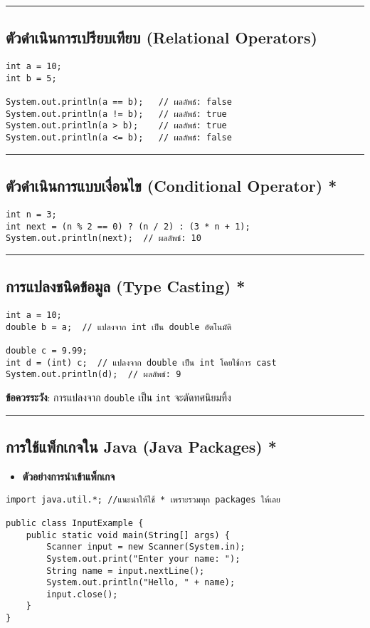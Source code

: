 \documentclass[11pt]{article}
\begin{document}
\noindent\rule{\textwidth}{0.5pt}
\subsection{ตัวดำเนินการเปรียบเทียบ (Relational Operators)}
\label{sec:org0086cbb}
\begin{verbatim}
int a = 10;
int b = 5;

System.out.println(a == b);   // ผลลัพธ์: false
System.out.println(a != b);   // ผลลัพธ์: true
System.out.println(a > b);    // ผลลัพธ์: true
System.out.println(a <= b);   // ผลลัพธ์: false
\end{verbatim}

\noindent\rule{\textwidth}{0.5pt}
\subsection{ตัวดำเนินการแบบเงื่อนไข (Conditional Operator) *}
\label{sec:org4d08e4c}
\begin{verbatim}
int n = 3;
int next = (n % 2 == 0) ? (n / 2) : (3 * n + 1);
System.out.println(next);  // ผลลัพธ์: 10
\end{verbatim}

\noindent\rule{\textwidth}{0.5pt}
\subsection{การแปลงชนิดข้อมูล (Type Casting) *}
\label{sec:org8c8078b}
\begin{verbatim}
int a = 10;
double b = a;  // แปลงจาก int เป็น double อัตโนมัติ

double c = 9.99;
int d = (int) c;  // แปลงจาก double เป็น int โดยใช้การ cast
System.out.println(d);  // ผลลัพธ์: 9
\end{verbatim}

\textbf{ข้อควรระวัง}: การแปลงจาก \texttt{double} เป็น \texttt{int} จะตัดทศนิยมทิ้ง

\noindent\rule{\textwidth}{0.5pt}
\subsection{การใช้แพ็กเกจใน Java (Java Packages) *}
\label{sec:orge6ec761}
\begin{itemize}
\item \textbf{ตัวอย่างการนำเข้าแพ็กเกจ}
\end{itemize}
\begin{verbatim}
import java.util.*; //แนะนำให้ใช้ * เพราะรวมทุก packages ให้เลย

public class InputExample {
    public static void main(String[] args) {
        Scanner input = new Scanner(System.in);
        System.out.print("Enter your name: ");
        String name = input.nextLine();
        System.out.println("Hello, " + name);
        input.close();
    }
}
\end{verbatim}
\end{document}
